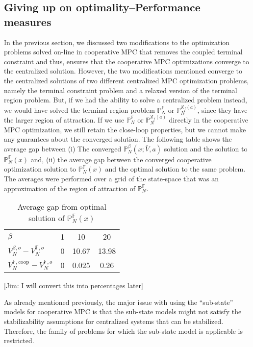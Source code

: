 \documentclass[10pt, twocolumn]{article}
\theoremstyle{definition}
\begin{document}
\subsection{Giving up on optimality--Performance measures}
In the previous section, we discussed two modifications to the
optimization problems solved on-line in cooperative MPC that removes
the coupled terminal constraint and thus, ensures that the cooperative
MPC optimizations converge to the centralized solution. However, the
two modifications mentioned converge to the centralized solutions of
two different centralized MPC optimization problems, namely the
terminal constraint problem and a relaxed version of the terminal
region problem. But, if we had the ability to solve a centralized
problem instead, we would have solved the terminal region problem
$\mathbb{P}_N^{\mathbb{F}}$ or $\mathbb{P}_N^{\mathbb{X}_f(a)}$, since
they have the larger region of attraction. If we use
$\mathbb{P}_N^{\mathbb{F}}$ or $\mathbb{P}_N^{\mathbb{X}_f(a)}$
directly in the cooperative MPC optimization, we still retain the
close-loop properties, but we cannot make any guarantees about the
converged solution. The following table shows the average gap between 
(i) The converged $\mathbb{P}_N^\beta(x;\bar{V},a)$ solution and the
solution to $\mathbb{P}_N^{\mathbb{F}}(x)$ and, (ii) the average gap
between the converged cooperative optimization solution to
$\mathbb{P}_N^{\mathbb{F}}(x)$ and the optimal solution to the same
problem. The averages were performed over a grid of the state-space 
that was an approximation of the region of attraction of
$\mathbb{P}_N^\mathbb{F}$.

\begin{table}
\label{tab:optimality_gap}
\caption{Average gap from optimal solution of
  $\mathbb{P}_N^{\mathbb{F}}(x)$}
\centering
\begin{tabular}{l|ccc}
\hline
$\beta$&1&10&20\\
${V}_N^{\beta,o}-{V}_N^{\mathbb{F},o}$&0&10.67&13.98\\
${V}_N^{\mathbb{F},\text{coop}}-V_N^{\mathbb{F},o}$&0&0.025&0.26\\ \hline
\end{tabular}
\end{table}
[Jim: I will convert this into percentages later]

As already mentioned previously, the major issue with using the
``sub-state'' models for cooperative MPC is that the sub-state models
might not satisfy the stabilizability assumptions for centralized
systems that can be stabilized. Therefore, the family of problems for
which the sub-state model is applicable is restricted.
\end{document}
